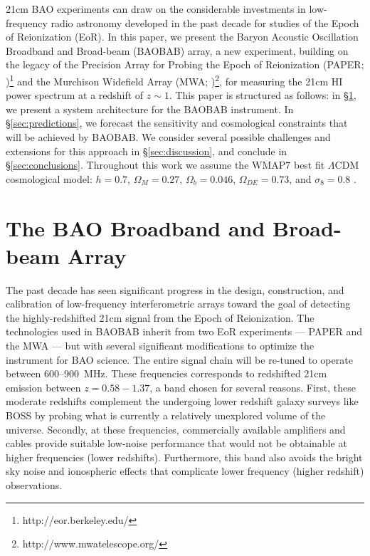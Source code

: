 \documentclass[10pt,iop]{emulateapj}
\begin{document}
21cm BAO experiments can draw on the considerable investments in
low-frequency radio astronomy developed in the past decade for studies of
the Epoch of Reionization (EoR).
In this paper, we present the Baryon Acoustic Oscillation Broadband and Broad-beam (BAOBAB)
array, a new experiment, building on the legacy of the Precision Array for Probing
the Epoch of Reionization (PAPER; \citealt{parsons_et_al_2010})\footnote{http://eor.berkeley.edu/} and the Murchison Widefield 
Array (MWA; \citealt{lonsdale_et_al_2009})\footnote{http://www.mwatelescope.org/}, 
for measuring the 21cm HI power spectrum at a redshift of $z\sim1$.
This paper is structured as follows: in \S\ref{sec:baobab}, 
we present a system architecture for the BAOBAB instrument.
In \S\ref{sec:predictions}, we forecast the sensitivity and cosmological
constraints that will be achieved by BAOBAB.
We consider several possible challenges  and extensions for this approach in \S\ref{sec:discussion}, 
and conclude in \S\ref{sec:conclusions}.  Throughout this work 
we assume the WMAP7 best fit $\Lambda$CDM cosmological model:
$h = 0.7$, $\Omega_M = 0.27$, $\Omega_b = 0.046$, $\Omega_{DE} = 0.73$, and $\sigma_8 = 0.8$ 
\citep{larson_et_al_2011}.

\section{The BAO Broadband and Broad-beam Array}
\label{sec:baobab}

The past decade has seen significant progress in the design, construction,
and calibration of low-frequency interferometric arrays toward the goal
of detecting the highly-redshifted 21cm signal from the Epoch of Reionization.
The technologies used in BAOBAB inherit from two EoR experiments ---
PAPER and the MWA --- but with several significant modifications to optimize the instrument
for BAO science.  The entire signal chain will be re-tuned to operate between 
600--900~MHz.  These frequencies corresponds to redshifted 21cm emission between $z = 0.58-1.37$,
a band chosen for several reasons.  First, these moderate redshifts complement the undergoing lower
redshift galaxy surveys like BOSS by probing what is currently a relatively unexplored volume of the universe.
Secondly, at these frequencies, commercially available amplifiers and cables provide suitable
low-noise performance that would not be obtainable at higher frequencies (lower redshifts).  
Furthermore, this band also avoids the bright sky noise and ionospheric effects that complicate
lower frequency (higher redshift) observations. 
\end{document}
